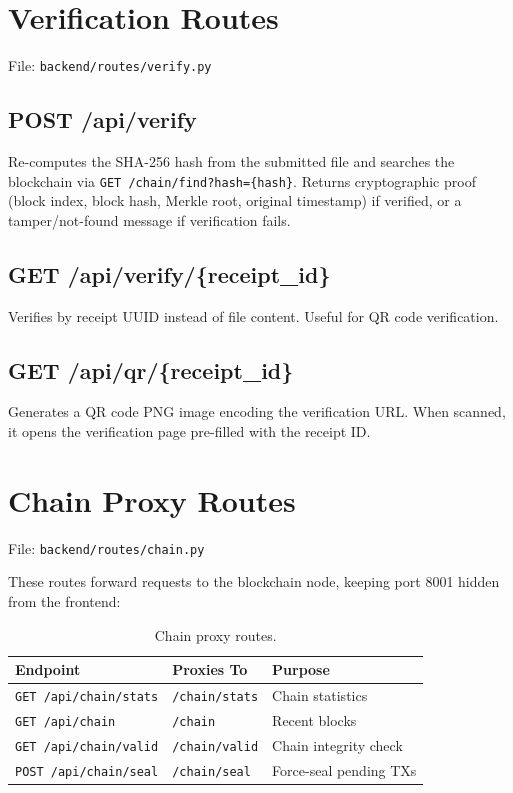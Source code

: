 \documentclass[12pt, a4paper]{report}
\begin{document}
\section{Verification Routes}

File: \texttt{backend/routes/verify.py}

\subsection{POST /api/verify}
Re-computes the SHA-256 hash from the submitted file and searches the
blockchain via \texttt{GET /chain/find?hash=\{hash\}}. Returns cryptographic
proof (block index, block hash, Merkle root, original timestamp) if verified,
or a tamper/not-found message if verification fails.

\subsection{GET /api/verify/\{receipt\_id\}}
Verifies by receipt UUID instead of file content. Useful for QR code
verification.

\subsection{GET /api/qr/\{receipt\_id\}}
Generates a QR code PNG image encoding the verification URL. When scanned, it
opens the verification page pre-filled with the receipt ID.

\section{Chain Proxy Routes}

File: \texttt{backend/routes/chain.py}

These routes forward requests to the blockchain node, keeping port 8001 hidden
from the frontend:

\begin{table}[H]
\centering
\begin{tabularx}{\textwidth}{l l X}
\toprule
\textbf{Endpoint} & \textbf{Proxies To} & \textbf{Purpose} \\
\midrule
\texttt{GET /api/chain/stats} & \texttt{/chain/stats} & Chain statistics \\
\texttt{GET /api/chain} & \texttt{/chain} & Recent blocks \\
\texttt{GET /api/chain/valid} & \texttt{/chain/valid} & Chain integrity check \\
\texttt{POST /api/chain/seal} & \texttt{/chain/seal} & Force-seal pending TXs \\
\bottomrule
\end{tabularx}
\caption{Chain proxy routes.}
\end{table}
\end{document}
